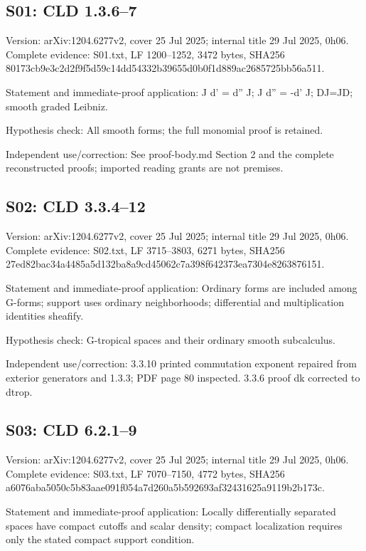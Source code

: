 \documentclass[11pt]{article}
\begin{document}
\subsection{S01: CLD 1.3.6--7}

Version: arXiv:1204.6277v2, cover 25 Jul 2025; internal title 29 Jul 2025, 0h06. Complete evidence: S01.txt, LF 1200--1252, 3472 bytes, SHA256 80173cb9e3c2d2f9f5d59c14dd54332b39655d0b0f1d889ac2685725bb56a511.

Statement and immediate-proof application: J d' = d'' J; J d'' = -d' J; DJ=JD; smooth graded Leibniz.

Hypothesis check: All smooth forms; the full monomial proof is retained.

Independent use/correction: See proof-body.md Section 2 and the complete reconstructed proofs; imported reading grants are not premises.

\subsection{S02: CLD 3.3.4--12}

Version: arXiv:1204.6277v2, cover 25 Jul 2025; internal title 29 Jul 2025, 0h06. Complete evidence: S02.txt, LF 3715--3803, 6271 bytes, SHA256 27ed82bac34a4485a5d132ba8a9cd45062c7a398f642373ea7304e8263876151.

Statement and immediate-proof application: Ordinary forms are included among G-forms; support uses ordinary neighborhoods; differential and multiplication identities sheafify.

Hypothesis check: G-tropical spaces and their ordinary smooth subcalculus.

Independent use/correction: 3.3.10 printed commutation exponent repaired from exterior generators and 1.3.3; PDF page 80 inspected. 3.3.6 proof dk corrected to dtrop.

\subsection{S03: CLD 6.2.1--9}

Version: arXiv:1204.6277v2, cover 25 Jul 2025; internal title 29 Jul 2025, 0h06. Complete evidence: S03.txt, LF 7070--7150, 4772 bytes, SHA256 a6076aba5050c5b83aae091f054a7d260a5b592693af32431625a9119b2b173c.

Statement and immediate-proof application: Locally differentially separated spaces have compact cutoffs and scalar density; compact localization requires only the stated compact support condition.
\end{document}

